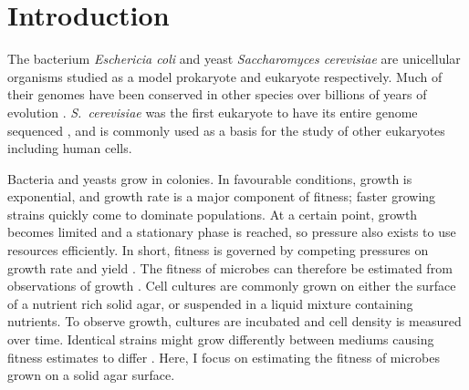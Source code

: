 \graphicspath{{images/}}

\section{Introduction}
\label{sec:introduction}

The bacterium \textit{Eschericia coli} and yeast \textit{Saccharomyces
  cerevisiae} are unicellular organisms studied as a model prokaryote
and eukaryote respectively.
Much of their genomes have been conserved in other species over
billions of years of evolution
\citep{OBrien2005inparanoid}. \textit{S.~cerevisiae} was the first
eukaryote to have its entire genome sequenced \citep{goffeau1996life},
and is commonly used as a basis for the study of other eukaryotes
including human cells.

Bacteria and yeasts grow in colonies. In favourable conditions, growth
is exponential, and growth rate is a major component of fitness;
faster growing strains quickly come to dominate populations. At a
certain point, growth becomes limited and a stationary phase is
reached, so pressure also exists to use resources efficiently. In
short, fitness is governed by competing pressures on growth rate and
yield \citep{dethlefsen2007performance}. The fitness of microbes can
therefore be estimated from observations of growth
\citep{Baryshnikova2010,Addinall2011}. Cell cultures are commonly
grown on either the surface of a nutrient rich solid agar, or
suspended in a liquid mixture containing nutrients. To observe growth,
cultures are incubated and cell density is measured over
time. Identical strains might grow differently between mediums causing
fitness estimates to differ \citep{Baryshnikova2010}. Here, I focus on
estimating the fitness of microbes grown on a solid agar surface.


